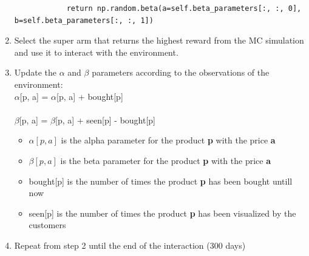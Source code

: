 \begin{enumerate}
\begin{verbatim}
            return np.random.beta(a=self.beta_parameters[:, :, 0], b=self.beta_parameters[:, :, 1])
        \end{verbatim}
    \item Select the super arm that returns the highest reward from the MC simulation and use it to interact with the environment.
    \item Update the $\alpha$ and $\beta$ parameters according to the observations of the environment:\\
        $\alpha$[p, a] = $\alpha$[p, a] + bought[p]\\\\
        $\beta$[p, a] = $\beta$[p, a] + seen[p] - bought[p]
    \begin{itemize}
        \item $\alpha[p, a]$ is the alpha parameter for the product {\bf p} with the price {\bf a}
        \item $\beta[p, a]$ is the beta parameter for the product {\bf p} with the price {\bf a}
        \item bought[p] is the number of times the product {\bf p} has been bought untill now
        \item seen[p] is the number of times the product {\bf p} has been visualized by the customers
    \end{itemize}
    \item Repeat from step 2 until the end of the interaction (300 days)
\end{enumerate}
